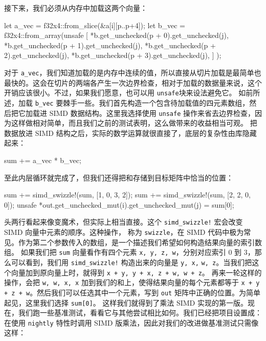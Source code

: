 接下来，我们必须从内存中加载这两个向量：
\begin{codebox}[rust]
let a_vec = f32x4::from_slice(&a[i][p..p+4]);
let b_vec = f32x4::from_array(unsafe {
    [
        *b.get_unchecked(p + 0).get_unchecked(j),
        *b.get_unchecked(p + 1).get_unchecked(j),
        *b.get_unchecked(p + 2).get_unchecked(j),
        *b.get_unchecked(p + 3).get_unchecked(j),
    ]
});
\end{codebox}
对于 \texttt{a\_vec}，我们知道加载的是内存中连续的值，所以直接从切片加载是最简单也最快的。这会在切片的两端各产生一次边界检查，相对于加载的数据量来说，这个开销应该很小。不过，如果我们愿意，也可以用 \texttt{unsafe}块来设法避免它。
如前所述，加载 \texttt{b\_vec} 要棘手一些。我们首先构造一个包含待加载值的四元素数组，然后把它加载进 SIMD 数据结构。这里我选择使用 \texttt{unsafe} 操作来省去边界检查，因为这样做相对简单，而且我们之前的测试表明，这么做带来的收益相当可观。
把数据放进 SIMD 结构之后，实际的数学运算就很直接了，底层的复杂性由库隐藏起来：
\begin{codebox}[text]
sum += a_vec * b_vec;
\end{codebox}
至此内层循环就完成了，但我们还得把和存储到目标矩阵中恰当的位置：
\begin{codebox}[rust]
sum += simd_swizzle!(sum, [1, 0, 3, 2]);
sum += simd_swizzle!(sum, [2, 2, 0, 0]);
unsafe {
    *out.get_unchecked_mut(i).get_unchecked_mut(j) = sum[0];
}
\end{codebox}
\label{idx:idx_81b2e5c1}
头两行看起来像变魔术，但实际上相当直接。这个
\texttt{simd\_\allowbreak{}swizzle!} 宏会改变 SIMD 向量中元素的顺序。这种操作，
称为 \texttt{swizzle}，在 SIMD 代码中极为常见。作为第二个参数传入的数组，是一个描述我们希望如何构造结果向量的索引数组。
如果我们把 \texttt{sum} 向量看作有四个元素 \texttt{x, y, z, w}，分别对应索引 0 到 3，那么可以看到，我们用 \texttt{simd\_\allowbreak{}swizzle!} 构造出来的向量是 \texttt{y, x,}
\texttt{w, z}。当我们把这个向量加到原向量上时，就得到 \texttt{x + y,\allowbreak{} y + x,\allowbreak{} z + w,\allowbreak{} w + z}。
再来一轮这样的操作，会把 \texttt{w, w, x, x} 加到我们的和上，使得结果向量的每个元素都等于 \texttt{x + y + z + w}。然后我们可以任选其中一个元素，写到 \texttt{out} 矩阵中正确的位置。为简单起见，这里我们选择 \texttt{sum[0]}。
这样我们就得到了乘法 SIMD 实现的第一版。现在，我们跑一些基准测试，看看它与其他尝试相比如何。我们已经把项目设置成：在使用 \texttt{nightly} 特性时调用 SIMD 版乘法，因此对我们的改进做基准测试只需像这样：
